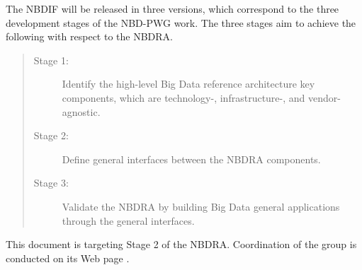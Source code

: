 The NBDIF will be released in three
versions, which correspond to the three development stages of the
NBD-PWG work. The three stages aim to achieve the following with
respect to the NBDRA.

\begin{quote}
\begin{description}
\item[Stage 1:] Identify the high-level Big Data reference architecture
  key components, which are technology-, infrastructure-, and
  vendor-agnostic.
\item[Stage 2:] Define general interfaces between the NBDRA components.
\item[Stage 3:] Validate the NBDRA by building Big Data general
  applications through the general interfaces.
\end{description}
\end{quote}

This document is targeting Stage 2 of the NBDRA. Coordination of the
group is conducted on its Web page \cite{www-nbdwg}. 
